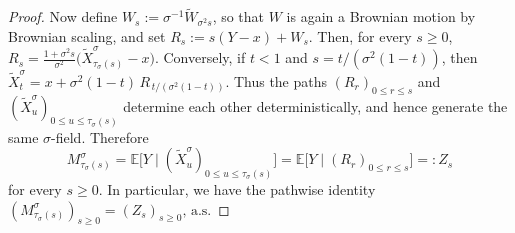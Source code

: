 \documentclass[10pt,a4paper]{amsart}
\newcommand{\E}{\mathbb{E}}
\newcommand{\R}{\mathbb{R}}
\begin{document}
\begin{proof}
		Now define \(W_s:=\sigma^{-1}\widetilde W_{\sigma^2 s}\), so that \(W\) is again a Brownian motion by Brownian scaling, and set \(R_s:=s(Y-x)+W_s\). Then, for every \(s\ge0\),
		$
		R_s=\frac{1+\sigma^2 s}{\sigma^2}\bigl(\widetilde X_{\tau_\sigma(s)}^\sigma-x\bigr)
		$. 
		Conversely, if \(t<1\) and \(s=t/(\sigma^2(1-t))\), then
		$
		\widetilde X_t^\sigma=x+\sigma^2(1-t)\,R_{\,t/(\sigma^2(1-t))}
		$. 
		Thus the paths \((R_r)_{0\le r\le s}\) and \((\widetilde X_u^\sigma)_{0\le u\le \tau_\sigma(s)}\) determine each other deterministically, and hence generate the same \(\sigma\)-field. Therefore
		\[
		M_{\tau_\sigma(s)}^\sigma
		=
		\E\big[Y\mid (\widetilde X_u^\sigma)_{0\le u\le \tau_\sigma(s)}\big]
		=
		\E\big[Y\mid (R_r)_{0\le r\le s}\big]
		=:Z_s
		\]
		for every \(s\ge0\). In particular,  we have the pathwise identity
		$
		(M^\sigma_{\tau_\sigma(s)})_{s\ge0}=(Z_s)_{s\ge0},\,\text{a.s.} 
		$ \qedhere
	\end{proof}
\end{document}
